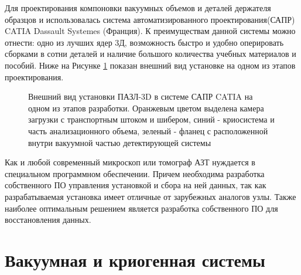 Для проектирования компоновки вакуумных объемов и деталей держателя образцов и использовалась система автоматизированного проектирования(САПР) CATIA Dassault Systemes (Франция). К преимуществам данной системы можно отнести: одно из лучших ядер 3Д, возможность быстро и удобно оперировать сборками в сотни деталей и наличие большого количества учебных материалов и пособий. Ниже на Рисунке \cref{fig:APPLE_CAD} показан внешний вид установке на одном из этапов проектирования.
\begin{figure}[htb]
	\caption{Внешний вид установки ПАЗЛ-3D в системе САПР CATIA на одном из этапов разработки. Оранжевым цветом выделена камера загрузки с транспортным штоком и шибером, синий - криосистема и часть анализационного объема, зеленый - фланец с расположенной внутри вакуумной частью детектирующей системы}
	\label{fig:APPLE_CAD}
\end{figure}

Как и любой современный микроскоп или томограф АЗТ нуждается в специальном программном обеспечении. Причем необходима разработка собственного ПО управления установкой и сбора на ней данных, так как разрабатываемая установка имеет отличные от зарубежных аналогов узлы. Также наиболее оптимальным решением является разработка собственного ПО для восстановления данных.


\FloatBarrier

\section{Вакуумная и криогенная системы}\label{sec:ch2/sec2}

